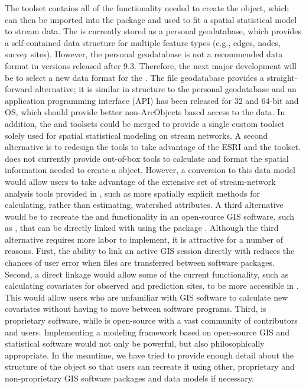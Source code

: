 \documentclass[article]{jss}
\begin{document}
The  toolset contains all of the functionality
needed to create the  object, which can then be imported
into the  package and used to fit a spatial statistical model
to stream data.  The  is currently stored as a personal
geodatabase, which provides a self-contained data structure for
multiple feature types (e.g., edges, nodes, survey sites). However,
the personal geodatabase is not a recommended data format in
 versions released after 9.3. Therefore, the next
major development will be to select a new data format for the . The
 file geodatabase provides a straight-forward
alternative; it is similar in structure to the personal geodatabase
and an application programming interface (API) has been released for
32 and 64-bit  and  OS, which should
provide better non-ArcObjects based access to the data. In addition,
the  and  toolsets could be merged to provide a single
custom toolset solely used for spatial statistical modeling on stream
networks. A second alternative is to redesign the  tools to take
advantage of the ESRI  and the  toolset.  does not currently provide out-of-box tools to calculate and
format the spatial information needed to create a 
object. However, a conversion to this data model would allow users to
take advantage of the extensive set of stream-network analysis tools
provided in , such as more spatially explicit methods for
calculating, rather than estimating, watershed attributes. A third
alternative would be to recreate the  and 
functionality in an open-source GIS software, such as 
\citep{GRAS:geog:2008}, that can be directly linked with 
using the  package \citep{Biva:Pebe:Gome:appl:2008}. Although the third alternative
requires more labor to implement, it is attractive for a number of
reasons. First, the ability to link an active GIS session directly
with  reduces the chances of user error when files are
transferred between software packages. Second, a direct linkage would
allow some of the current functionality, such as calculating
covariates for observed and prediction sites, to be more accessible in
. This would allow users who are unfamiliar with GIS
software to calculate new covariates without having to move between
software programs. Third,  is proprietary software,
while  is open-source with a vast community of
contributors and users. Implementing a modeling framework based on
open-source GIS and statistical software would not only be powerful,
but also philosophically appropriate. In the meantime, we have tried
to provide enough detail about the structure of the  object
so that users can recreate it using other, proprietary and
non-proprietary GIS software packages and data models if necessary.
\end{document}
